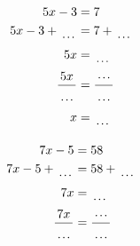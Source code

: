 \documentclass[12pt]{article}
\newcounter{minipagecount}
\begin{document}
\begin{multicols}{2}
\begin{minipage}[t]{0.45\textwidth}
    \raggedright %
    \begin{align*} %
        5x - 3 &= 7\\
        5x - 3 + \dotuline{\hspace{5mm}} &= 7 + \dotuline{\hspace{5mm}}\\
        5x &= \dotuline{\hspace{5mm}}\\
        \frac{5x}{\dotuline{\hspace{5mm}}} &= \frac{\dotuline{\hspace{5mm}}}{\dotuline{\hspace{5mm}}}\\
        x &= \dotuline{\hspace{5mm}}\\
    \end{align*}
\end{minipage}\columnbreak
\noindent{(\theminipagecount)}\hspace{0.1mm} %
\begin{minipage}[t]{0.45\textwidth} %
    \vspace{-26pt}  %
    \raggedright %
    \begin{align*} %
        7x - 5 &= 58\\
        7x - 5 + \dotuline{\hspace{5mm}} &= 58 + \dotuline{\hspace{5mm}}\\
        7x &= \dotuline{\hspace{5mm}}\\
        \frac{7x}{\dotuline{\hspace{5mm}}} &= \frac{\dotuline{\hspace{5mm}}}{\dotuline{\hspace{5mm}}}\\

\end{align*}
\end{minipage}
\end{multicols}
\end{document}
